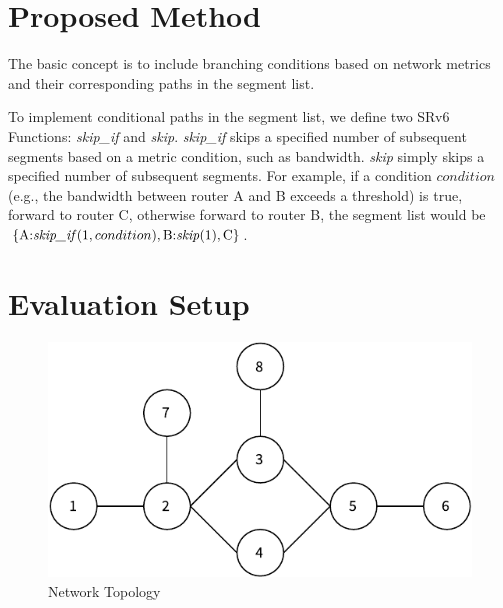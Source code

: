 \documentclass[conference]{IEEEtran}
\begin{document}
\section{Proposed Method}

The basic concept is to include branching conditions based on network metrics and their corresponding paths in the segment list.

To implement conditional paths in the segment list, we define two SRv6 Functions: \textit{skip\_if} and \textit{skip}.
\textit{skip\_if} skips a specified number of subsequent segments based on a metric condition, such as bandwidth.
\textit{skip} simply skips a specified number of subsequent segments.
For example, if a condition $condition$ (e.g., the bandwidth between router A and B exceeds a threshold) is true, forward to router C, otherwise forward to router B, the segment list would be $\{ \text{A:\textit{skip\_if}}(1, condition), \text{B:\textit{skip}}(1), \text{C} \}$.


\section{Evaluation Setup}

\begin{figure}[t]
  \centering
  \includegraphics[width=0.7\linewidth]{./figures/topo.pdf}
  \caption{Network Topology}
  \label{fig:network-topology}
\end{figure}
\end{document}
